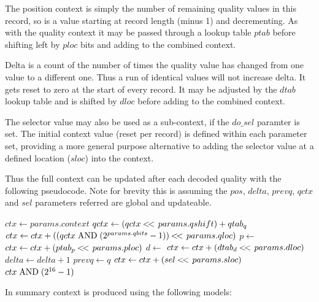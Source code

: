 \documentclass[a4paper]{article}
\begin{document}
The position context is simply the number of remaining quality values
in this record, so is a value starting at record length (minus 1) and
decrementing.  As with the quality context it may be passed through a
lookup table $ptab$ before shifting left by $ploc$ bits and adding to
the combined context.

Delta is a count of the number of times the quality value has changed
from one value to a different one.  Thus a run of identical values
will not increase delta.  It gets reset to zero at the start of every
record.  It may be adjusted by the $dtab$ lookup table and is shifted
by $dloc$ before adding to the combined context.

The selector value may also be used as a sub-context, if the $do\_sel$
paramter is set.  The initial context value (reset per record) is
defined within each parameter set, providing a more general purpose
alternative to adding the selector value at a defined location
($sloc$) into the context.

Thus the full context can be updated after each decoded quality with
the following pseudocode.  Note for brevity this is assuming the
$pos$, $delta$, $prevq$, $qctx$ and $sel$ parameters referred are global and updateable.

\begin{algorithmic}[1]
  \State $ctx \gets params.context$ 
  \State $qctx \gets (qctx \mathbin{<\mkern-3mu<\,} params.qshift) + qtab_q$
  \State $ctx   \gets ctx + ((qctx \bitand (2^{params.qbits}-1)) \shiftl params.qloc)$
   
    \State $p \gets $
    \State $ctx \gets ctx + (ptab_p \mathbin{<\mkern-3mu<\,} params.ploc)$
  \EndIf
   
    \State $d \gets $
    \State $ctx \gets ctx + (dtab_d \mathbin{<\mkern-3mu<\,} params.dloc)$
      \State $delta \gets delta+1$
    \EndIf
    \State $prevq \gets q$
  \EndIf
   
    \State $ctx \gets ctx + (sel \mathbin{<\mkern-3mu<\,} params.sloc)$
  \EndIf
  \State \Return $ctx\bitand (2^{16}-1)$
\EndFunction
\end{algorithmic}

In summary context is produced using the following models:
\end{document}
